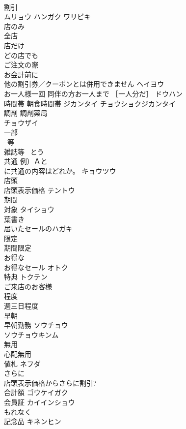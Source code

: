 \documentclass[8pt]{extreport}
\begin{document}
\begin{CJK}{UTF8}{min}
\\	割引 
\\	ムリョウ ハンガク ワリビキ 
\\	店のみ 
\\	全店	
\\	店だけ 
\\	どの店でも
\\	ご注文の際 
\\	お会計前に	
\\	他の割引券／クーポンとは併用できません	ヘイヨウ 
\\	お一人様一回 同伴の方お一人まで ［一人分だ］	ドウハン 
\\	時間帯 朝食時間帯	ジカンタイ チョウショクジカンタイ 
\\	調剤 調剤薬局	
\\	チョウザイ
\\	一部	
\\	~等 
\\	雑誌等	~とう 
\\	共通 例）Ａと
\\	に共通の内容はどれか。	キョウツウ 
\\	店頭 
\\	店頭表示価格	テントウ 
\\	期間	
\\	対象	タイショウ 
\\	葉書き 
\\	届いたセールのハガキ	
\\	限定 
\\	期間限定	
\\	お得な 
\\	お得なセール	オトク 
\\	特典	トクテン 
\\	ご来店のお客様	
\\	程度 
\\	週三日程度	
\\	早朝 
\\	早朝勤務	ソウチョウ 
\\	ソウチョウキンム 
\\	無用 
\\	心配無用	
\\	値札	ネフダ 
\\	さらに 
\\	店頭表示価格からさらに割引?	
\\	合計額	ゴウケイガク 
\\	会員証	カイインショウ 
\\	もれなく	
\\	記念品	キネンヒン 

\end{CJK}
\end{document}
